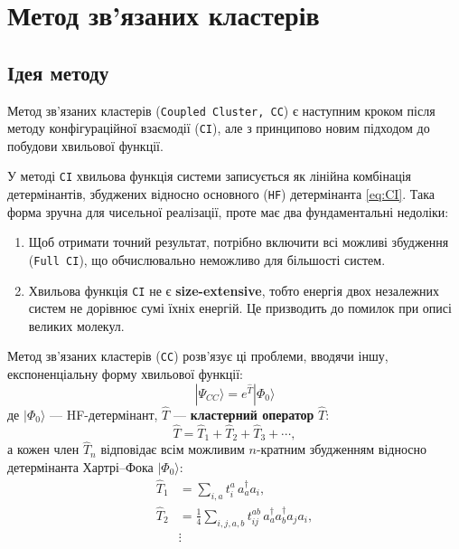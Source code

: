 

\section{Метод зв’язаних кластерів}


\subsection{Ідея методу}

Метод зв'язаних кластерів (\texttt{Coupled Cluster, CC}) є наступним кроком після методу
конфігураційної взаємодії (\texttt{CI}), але з принципово новим підходом
до побудови хвильової функції.

У методі \texttt{CI} хвильова функція системи записується як лінійна комбінація
детермінантів, збуджених відносно основного (\texttt{HF}) детермінанта \eqref{eq:CI}.
Така форма зручна для чисельної реалізації, проте має два
фундаментальні недоліки:
\begin{enumerate}
    \item Щоб отримати точний результат, потрібно включити всі можливі
    збудження (\texttt{Full CI}), що обчислювально неможливо для більшості систем.
    \item Хвильова функція \texttt{CI} не є \textbf{size-extensive}, тобто енергія двох незалежних систем
    не дорівнює сумі їхніх енергій. Це призводить до помилок при описі
    великих молекул.
\end{enumerate}

Метод зв'язаних кластерів (\texttt{CC}) розв'язує ці проблеми, вводячи іншу,
експоненціальну форму хвильової функції:
\begin{equation}\label{eq:CC}
    |\Psi_{CC}\rangle = e^{\hat{T}} |\Phi_0\rangle
\end{equation}
де $|\Phi_0\rangle$ --- HF-детермінант, $\hat{T}$ --- \textbf{кластерний оператор} $\hat{T}$:
\begin{equation}
    \hat{T} = \hat{T}_1 + \hat{T}_2 + \hat{T}_3 + \cdots,
\end{equation}
а кожен член \(\hat{T}_n\) відповідає всім можливим \(n\)-кратним збудженням
відносно детермінанта Хартрі–Фока $|\Phi_0\rangle$:
\begin{align}
    \hat{T}_1 &= \sum_{i,a} t_i^a\, a_a^\dagger a_i, \\
    \hat{T}_2 &= \frac{1}{4} \sum_{i,j,a,b} t_{ij}^{ab}\, a_a^\dagger a_b^\dagger a_j a_i, \\
    &\vdots
\end{align}

